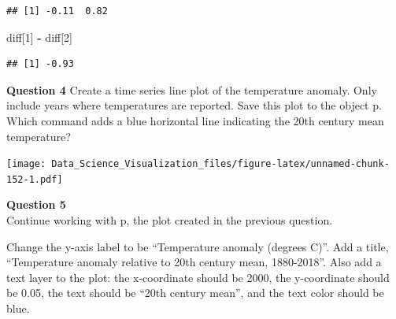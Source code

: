 \documentclass[
]{article}
\newenvironment{Shaded}{\begin{snugshade}}{\end{snugshade}}
\newcommand{\DataTypeTok}[1]{\textcolor[rgb]{0.13,0.29,0.53}{#1}}
\newcommand{\DecValTok}[1]{\textcolor[rgb]{0.00,0.00,0.81}{#1}}
\newcommand{\KeywordTok}[1]{\textcolor[rgb]{0.13,0.29,0.53}{\textbf{#1}}}
\newcommand{\NormalTok}[1]{#1}
\newcommand{\OperatorTok}[1]{\textcolor[rgb]{0.81,0.36,0.00}{\textbf{#1}}}
\newcommand{\StringTok}[1]{\textcolor[rgb]{0.31,0.60,0.02}{#1}}
\begin{document}
\begin{verbatim}
## [1] -0.11  0.82
\end{verbatim}

\begin{Shaded}
\begin{Highlighting}[]
\NormalTok{diff[}\DecValTok{1}\NormalTok{] }\OperatorTok{-}\StringTok{ }\NormalTok{diff[}\DecValTok{2}\NormalTok{]}
\end{Highlighting}
\end{Shaded}

\begin{verbatim}
## [1] -0.93
\end{verbatim}

\textbf{Question 4} Create a time series line plot of the temperature
anomaly. Only include years where temperatures are reported. Save this
plot to the object p.\\
Which command adds a blue horizontal line indicating the 20th century
mean temperature?

\begin{Shaded}
\end{Shaded}

\texttt{[image: Data\_Science\_Visualization\_files/figure-latex/unnamed-chunk-152-1.pdf]}

\textbf{Question 5}\\
Continue working with p, the plot created in the previous question.

Change the y-axis label to be ``Temperature anomaly (degrees C)''. Add a
title, ``Temperature anomaly relative to 20th century mean, 1880-2018''.
Also add a text layer to the plot: the x-coordinate should be 2000, the
y-coordinate should be 0.05, the text should be ``20th century mean'',
and the text color should be blue.
\end{document}
